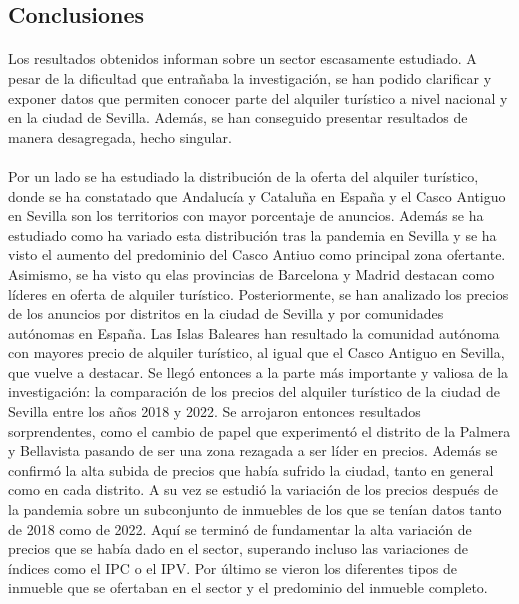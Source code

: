 \documentclass[a4paper,10pt]{article}
\begin{document}
    \setlength{\columnsep}{0.88cm}
    \begin{multicols}{2}

    \section{Conclusiones}

        \paragraph*{}
        Los resultados obtenidos informan sobre un sector escasamente estudiado. A pesar de la dificultad que entrañaba la investigación, se han podido
        clarificar y exponer datos que permiten conocer parte del alquiler turístico a nivel nacional y en la ciudad de Sevilla. Además, se han
        conseguido presentar resultados de manera desagregada, hecho singular. 
        
        \paragraph*{}
        Por un lado se ha estudiado la distribución de la oferta del alquiler 
        turístico, donde se ha constatado que Andalucía y Cataluña en España y el Casco Antiguo en Sevilla son los territorios con mayor porcentaje
        de anuncios. Además se ha estudiado como ha variado esta distribución tras la pandemia en Sevilla y se ha visto el aumento del predominio del 
        Casco Antiuo como principal zona ofertante. Asimismo, se ha visto qu elas provincias de Barcelona y Madrid destacan como líderes en oferta de alquiler turístico. Posteriormente, se han analizado los precios de los anuncios por distritos en la ciudad de Sevilla y por comunidades autónomas en España.
        Las Islas Baleares han resultado la comunidad autónoma con mayores precio de alquiler turístico, al igual que el Casco Antiguo en Sevilla, que 
        vuelve a destacar. Se llegó entonces a la parte más importante y valiosa de la investigación: la comparación de los precios del alquiler turístico
        de la ciudad de Sevilla entre los años 2018 y 2022. Se arrojaron entonces resultados sorprendentes, como el cambio de papel que experimentó el distrito 
        de la Palmera y Bellavista pasando de ser una zona rezagada a ser líder en precios. Además se confirmó la alta subida de precios que había sufrido la ciudad, tanto en general como en cada distrito. A su vez se estudió la variación de los precios después de la pandemia sobre un subconjunto de 
        inmuebles de los que se tenían datos tanto de 2018 como de 2022. Aquí se terminó de fundamentar la alta variación de precios que se había dado en el 
        sector, superando incluso las variaciones de índices como el IPC o el IPV. Por último se vieron los diferentes tipos de inmueble que se ofertaban
        en el sector y el predominio del inmueble completo. 


\end{multicols}
\end{document}
